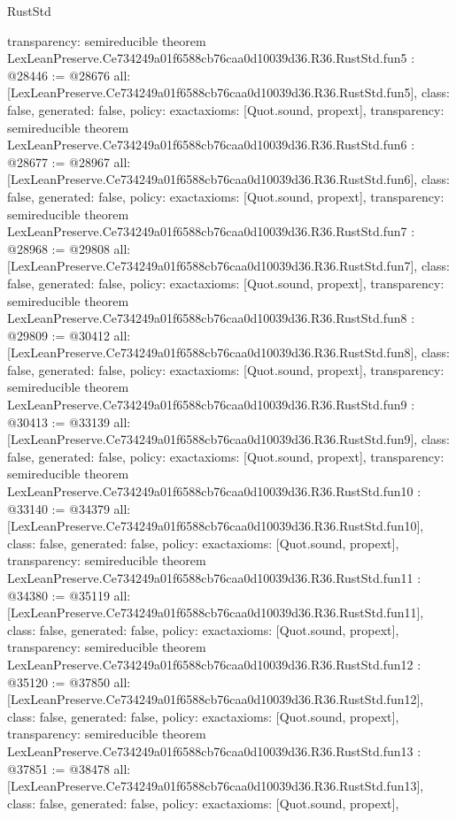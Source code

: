 \begin{lexlean}{RustStd}
\begin{coremodule}
{  transparency: semireducible
}
theorem LexLeanPreserve.Ce734249a01f6588cb76caa0d10039d36.R36.RustStd.fun5 : @28446 := @28676 {
  all: [LexLeanPreserve.Ce734249a01f6588cb76caa0d10039d36.R36.RustStd.fun5],
  class: false,
  generated: false,
  policy: exact{axioms: [Quot.sound, propext]},
  transparency: semireducible
}
theorem LexLeanPreserve.Ce734249a01f6588cb76caa0d10039d36.R36.RustStd.fun6 : @28677 := @28967 {
  all: [LexLeanPreserve.Ce734249a01f6588cb76caa0d10039d36.R36.RustStd.fun6],
  class: false,
  generated: false,
  policy: exact{axioms: [Quot.sound, propext]},
  transparency: semireducible
}
theorem LexLeanPreserve.Ce734249a01f6588cb76caa0d10039d36.R36.RustStd.fun7 : @28968 := @29808 {
  all: [LexLeanPreserve.Ce734249a01f6588cb76caa0d10039d36.R36.RustStd.fun7],
  class: false,
  generated: false,
  policy: exact{axioms: [Quot.sound, propext]},
  transparency: semireducible
}
theorem LexLeanPreserve.Ce734249a01f6588cb76caa0d10039d36.R36.RustStd.fun8 : @29809 := @30412 {
  all: [LexLeanPreserve.Ce734249a01f6588cb76caa0d10039d36.R36.RustStd.fun8],
  class: false,
  generated: false,
  policy: exact{axioms: [Quot.sound, propext]},
  transparency: semireducible
}
theorem LexLeanPreserve.Ce734249a01f6588cb76caa0d10039d36.R36.RustStd.fun9 : @30413 := @33139 {
  all: [LexLeanPreserve.Ce734249a01f6588cb76caa0d10039d36.R36.RustStd.fun9],
  class: false,
  generated: false,
  policy: exact{axioms: [Quot.sound, propext]},
  transparency: semireducible
}
theorem LexLeanPreserve.Ce734249a01f6588cb76caa0d10039d36.R36.RustStd.fun10 : @33140 := @34379 {
  all: [LexLeanPreserve.Ce734249a01f6588cb76caa0d10039d36.R36.RustStd.fun10],
  class: false,
  generated: false,
  policy: exact{axioms: [Quot.sound, propext]},
  transparency: semireducible
}
theorem LexLeanPreserve.Ce734249a01f6588cb76caa0d10039d36.R36.RustStd.fun11 : @34380 := @35119 {
  all: [LexLeanPreserve.Ce734249a01f6588cb76caa0d10039d36.R36.RustStd.fun11],
  class: false,
  generated: false,
  policy: exact{axioms: [Quot.sound, propext]},
  transparency: semireducible
}
theorem LexLeanPreserve.Ce734249a01f6588cb76caa0d10039d36.R36.RustStd.fun12 : @35120 := @37850 {
  all: [LexLeanPreserve.Ce734249a01f6588cb76caa0d10039d36.R36.RustStd.fun12],
  class: false,
  generated: false,
  policy: exact{axioms: [Quot.sound, propext]},
  transparency: semireducible
}
theorem LexLeanPreserve.Ce734249a01f6588cb76caa0d10039d36.R36.RustStd.fun13 : @37851 := @38478 {
  all: [LexLeanPreserve.Ce734249a01f6588cb76caa0d10039d36.R36.RustStd.fun13],
  class: false,
  generated: false,
  policy: exact{axioms: [Quot.sound, propext]},
}
\end{coremodule}
\end{lexlean}

